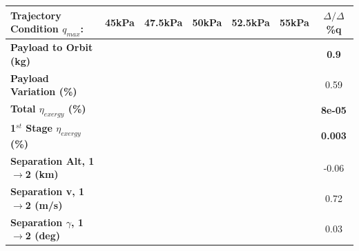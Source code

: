 \begin{table}[ht!] %
	\centering
	\begin{tabular}{l c c c c c c} 
		\hline \textbf{Trajectory Condition  \qquad  $q_{max}$: }
		&45kPa
		&47.5kPa
		&50kPa
		& 52.5kPa
		& 55kPa
		& $\Delta/\Delta$\%q
	\\
	\hline \textbf{Payload to Orbit (kg)}
	& \textbf{\PayloadToOrbitqFortyFiveNoReturn}
	& \textbf{\PayloadToOrbitqFortySevenNoReturn}
	& \textbf{\PayloadToOrbitqStandardNoReturn}
	& \textbf{\PayloadToOrbitqFiftyTwoNoReturn}
	& \textbf{\PayloadToOrbitqFiftyFiveNoReturn}
	&\textbf{0.9}
	\\
	\textbf{Payload Variation (\%)}
	& \PayloadVarqFortyFiveNoReturn
	& \PayloadVarqFortySevenNoReturn
	& \PayloadVarqStandardNoReturn
	& \PayloadVarqFiftyTwoNoReturn
	& \PayloadVarqFiftyFiveNoReturn
	&0.59
	\\
	\textbf{Total $\eta_{exergy}$ (\%)}
	& \textbf{\totalExergyEffqFortyFiveNoReturn}
	& \textbf{\totalExergyEffqFortySevenNoReturn}
	& \textbf{\totalExergyEffqStandardNoReturn}
	& \textbf{\totalExergyEffqFiftyTwoNoReturn}
	& \textbf{\totalExergyEffqFiftyFiveNoReturn}
	& \textbf{8e-05}
	\\
	\hline 
	\textbf{1$^{st}$ Stage $\eta_{exergy}$ (\%)}
	& \textbf{\firstExergyEffqFortyFiveNoReturn}
	& \textbf{\firstExergyEffqFortySevenNoReturn}
	& \textbf{\firstExergyEffqStandardNoReturn}
	& \textbf{\firstExergyEffqFiftyTwoNoReturn}
	& \textbf{\firstExergyEffqFiftyFiveNoReturn}
	& \textbf{0.003}
	\\
	\textbf{Separation Alt, 1$\rightarrow$2 (km)}
	& \firstsecondSeparationAltqFortyFiveNoReturn
	& \firstsecondSeparationAltqFortySevenNoReturn
	& \firstsecondSeparationAltqStandardNoReturn
	& \firstsecondSeparationAltqFiftyTwoNoReturn
	& \firstsecondSeparationAltqFiftyFiveNoReturn
	&-0.06
	\\
	\textbf{Separation v, 1$\rightarrow$2 (m/s)}
	& \firstsecondSeparationvqFortyFiveNoReturn
	& \firstsecondSeparationvqFortySevenNoReturn
	& \firstsecondSeparationvqStandardNoReturn
	& \firstsecondSeparationvqFiftyTwoNoReturn
	& \firstsecondSeparationvqFiftyFiveNoReturn
	&0.72
	\\
	\textbf{Separation $\gamma$, 1$\rightarrow$2 (deg)}
	& \firstsecondSeparationgammaqFortyFiveNoReturn
	& \firstsecondSeparationgammaqFortySevenNoReturn
	& \firstsecondSeparationgammaqStandardNoReturn
	& \firstsecondSeparationgammaqFiftyTwoNoReturn
	& \firstsecondSeparationgammaqFiftyFiveNoReturn
	&0.03
	\\
	\hline 

\end{tabular}
\end{table}
